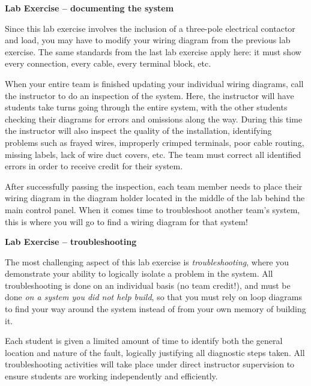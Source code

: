 \begin{itemize}
\vfil



\vfil \eject

\noindent
{\bf Lab Exercise -- documenting the system}

\vskip 5pt

Since this lab exercise involves the inclusion of a three-pole electrical contactor and load, you may have to modify your wiring diagram from the previous lab exercise.  The same standards from the last lab exercise apply here: it must show every connection, every cable, every terminal block, etc.  

When your entire team is finished updating your individual wiring diagrams, call the instructor to do an inspection of the system.  Here, the instructor will have students take turns going through the entire system, with the other students checking their diagrams for errors and omissions along the way.  During this time the instructor will also inspect the quality of the installation, identifying problems such as frayed wires, improperly crimped terminals, poor cable routing, missing labels, lack of wire duct covers, etc.  The team must correct all identified errors in order to receive credit for their system.  

After successfully passing the inspection, each team member needs to place their wiring diagram in the diagram holder located in the middle of the lab behind the main control panel.  When it comes time to troubleshoot another team's system, this is where you will go to find a wiring diagram for that system!

\vskip 10pt







\vfil \eject

\noindent
{\bf Lab Exercise -- troubleshooting}

\vskip 5pt

The most challenging aspect of this lab exercise is {\it troubleshooting}, where you demonstrate your ability to logically isolate a problem in the system.  All troubleshooting is done on an individual basis (no team credit!), and must be done {\it on a system you did not help build}, so that you must rely on loop diagrams to find your way around the system instead of from your own memory of building it.

Each student is given a limited amount of time to identify both the general location and nature of the fault, logically justifying all diagnostic steps taken.  All troubleshooting activities will take place under direct instructor supervision to ensure students are working independently and efficiently. 


\end{itemize}
